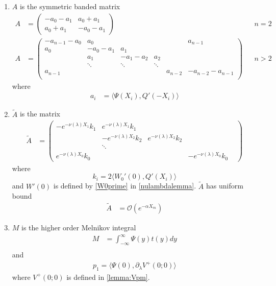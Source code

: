 \documentclass[thesis.tex]{subfiles}
\begin{document}
\begin{theorem}
\begin{enumerate}
\item $A$ is the symmetric banded matrix
\begin{align}\label{Asymm}
A &= \begin{pmatrix}
-a_0 -a_1 & a_0 + a_1 \\
a_0 + a_1 & -a_0 - a_1
\end{pmatrix} && n = 2 \\
A &= \begin{pmatrix}
-a_{n-1} - a_0 & a_0 & & &  & a_{n-1}\\
a_0 & -a_0 - a_1 &  a_1 \\
& a_1 & -a_1 - a_2 &  a_2 \\
& \ddots & \ddots & \ddots \\
a_{n-1} & & & & a_{n-2} & -a_{n-2} - a_{n-1} \\
\end{pmatrix} && n > 2 \nonumber
\end{align}
where
\begin{align*}
a_i &= \langle \Psi(X_i), Q'(-X_i) \rangle
\end{align*}

\item $\tilde{A}$ is the matrix
\begin{align*}
\tilde{A} &= \begin{pmatrix}
-e^{-\nu(\lambda)X_1} k_1 & e^{-\nu(\lambda)X_1} k_1 \\
& -e^{-\nu(\lambda)X_2} k_2 & e^{-\nu(\lambda)X_2} k_2 \\
& \ddots \\
e^{-\nu(\lambda)X_0} k_0 & &  & -e^{-\nu(\lambda)X_0} k_0 & 
\end{pmatrix}
\end{align*}
where 
\begin{equation*}
k_i = 2 \langle W_0'(0), Q'(X_i) \rangle
\end{equation*}
and $W'(0)$ is defined by \cref{W0prime} in \cref{nulambdalemma}. $\tilde{A}$ has uniform bound
\begin{align*}
\tilde{A} &= \mathcal{O}( e^{-\alpha X_m})
\end{align*}

\item $M$ is the higher order Melnikov integral
\begin{align*}
M &= \int_{-\infty}^\infty \Psi(y) t(y) dy \\
\end{align*}
and
\begin{align*}
p_1 = \langle \Psi(0), \partial_\lambda V^+(0; 0) \rangle
\end{align*}
where $V^+(0; 0)$ is defined in \cref{lemma:Vpm}.


\end{enumerate}
\end{theorem}
\end{document}
